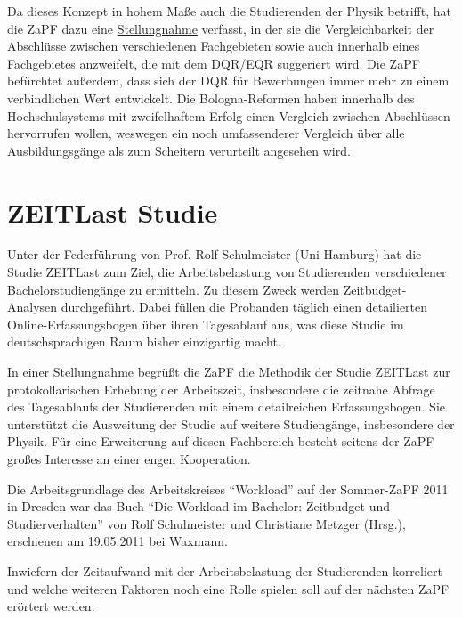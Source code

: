 \documentclass{scrartcl}
\begin{document}
Da dieses Konzept in hohem Maße auch die Studierenden der Physik betrifft, hat die ZaPF dazu eine
\href{http://www.zapfev.de/resolutionen/sose11/Reso_EQR-DQR.pdf}{Stellungnahme} verfasst, in der sie die
Vergleichbarkeit der Abschlüsse
zwischen verschiedenen Fachgebieten sowie auch innerhalb eines Fachgebietes anzweifelt, die mit dem DQR/EQR suggeriert
wird. Die ZaPF befürchtet außerdem, dass sich der DQR für Bewerbungen immer mehr zu einem verbindlichen Wert entwickelt.
Die Bologna-Reformen haben innerhalb des Hochschulsystems mit zweifelhaftem Erfolg einen Vergleich zwischen Abschlüssen
hervorrufen wollen, weswegen ein noch umfassenderer Vergleich über alle Ausbildungsgänge als zum Scheitern verurteilt
angesehen wird. 


\section*{ZEITLast Studie}
\vspace{-12pt}
Unter der Federführung von Prof. Rolf Schulmeister (Uni Hamburg) hat die Studie ZEITLast zum Ziel, die Arbeitsbelastung
von Studierenden verschiedener Bachelorstudiengänge zu ermitteln. Zu diesem Zweck werden Zeitbudget-Analysen
durchgeführt. Dabei füllen die Probanden täglich einen detailierten Online-Erfassungsbogen über ihren Tagesablauf aus,
was diese Studie im deutschsprachigen Raum bisher einzigartig macht.

In einer \href{http://www.zapfev.de/resolutionen/sose11/Reso_ZEITlast.pdf}{Stellungnahme} begrüßt die ZaPF
die Methodik der Studie ZEITLast zur protokollarischen Erhebung der Arbeitszeit,
insbesondere die zeitnahe Abfrage des Tagesablaufs der Studierenden mit einem detailreichen Erfassungsbogen. Sie
unterstützt die Ausweitung der Studie auf weitere Studiengänge, insbesondere der Physik. Für eine Erweiterung auf diesen
Fachbereich besteht seitens der ZaPF großes Interesse an einer engen Kooperation.

Die Arbeitsgrundlage des Arbeitskreises “Workload” auf der Sommer-ZaPF 2011 in Dresden war das Buch “Die Workload im
Bachelor: Zeitbudget und Studierverhalten” von Rolf Schulmeister und Christiane Metzger (Hrsg.), erschienen am
19.05.2011 bei Waxmann.

Inwiefern der Zeitaufwand mit der Arbeitsbelastung der Studierenden korreliert und welche weiteren Faktoren noch eine
Rolle spielen soll auf der nächsten ZaPF erörtert werden.
\end{document}
